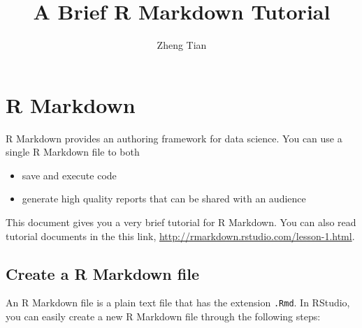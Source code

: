 \documentclass[11pt]{article}
\author{Zheng Tian}
\date{}
\title{A Brief R Markdown Tutorial}
\begin{document}
\maketitle


\section{R Markdown}
\label{sec:orgd6403b6}

R Markdown provides an authoring framework for data science. You can use
a single R Markdown file to both
\begin{itemize}
\item save and execute code
\item generate high quality reports that can be shared with an audience
\end{itemize}

This document gives you a very brief tutorial for R Markdown. You can
also read tutorial documents in the this link,
\url{http://rmarkdown.rstudio.com/lesson-1.html}.

\subsection*{Create a R Markdown file}
\label{sec:org5d3082f}

An R Markdown file is a plain text file that has the extension \texttt{.Rmd}.
In RStudio, you can easily create a new R Markdown file through the
following steps:

\end{document}
